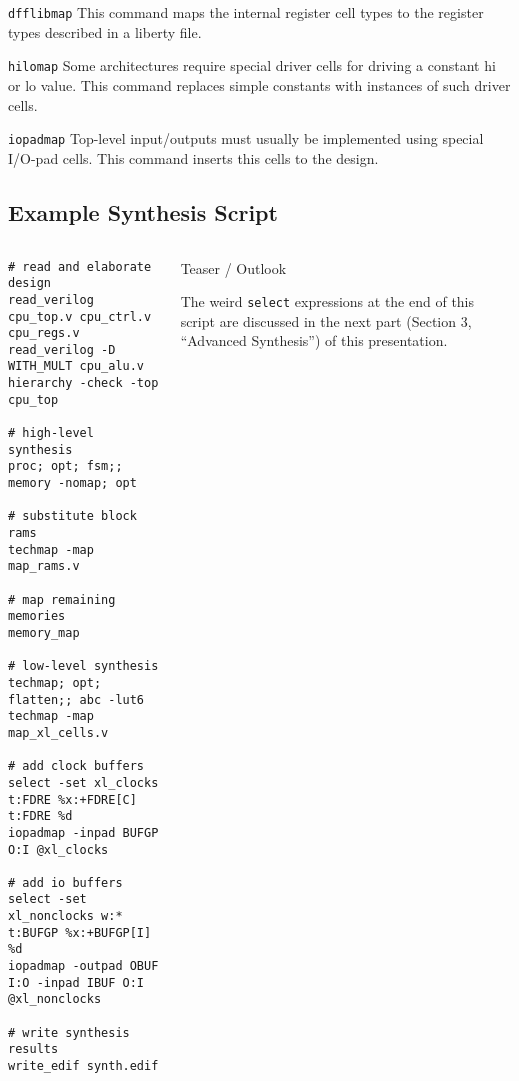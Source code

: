 \begin{frame}{\subsecname}
\begin{block}{\tt dfflibmap}
This command maps the internal register cell types to the register types
described in a liberty file.
\end{block}

\bigskip
\begin{block}{\tt hilomap}
Some architectures require special driver cells for driving a constant hi or lo
value. This command replaces simple constants with instances of such driver cells.
\end{block}

\bigskip
\begin{block}{\tt iopadmap}
Top-level input/outputs must usually be implemented using special I/O-pad cells.
This command inserts this cells to the design.
\end{block}
\end{frame}


\subsection{Example Synthesis Script}

\begin{frame}[fragile]{\subsecname}
\begin{columns}
\column[t]{4cm}
\begin{lstlisting}[basicstyle=\ttfamily\fontsize{6pt}{7pt}\selectfont, language=ys]
# read and elaborate design
read_verilog cpu_top.v cpu_ctrl.v cpu_regs.v
read_verilog -D WITH_MULT cpu_alu.v
hierarchy -check -top cpu_top

# high-level synthesis
proc; opt; fsm;; memory -nomap; opt

# substitute block rams
techmap -map map_rams.v

# map remaining memories
memory_map

# low-level synthesis
techmap; opt; flatten;; abc -lut6
techmap -map map_xl_cells.v

# add clock buffers
select -set xl_clocks t:FDRE %x:+FDRE[C] t:FDRE %d
iopadmap -inpad BUFGP O:I @xl_clocks

# add io buffers
select -set xl_nonclocks w:* t:BUFGP %x:+BUFGP[I] %d
iopadmap -outpad OBUF I:O -inpad IBUF O:I @xl_nonclocks

# write synthesis results
write_edif synth.edif
\end{lstlisting}
\column[t]{6cm}
\vskip1cm
\begin{block}{Teaser / Outlook}
\small\parbox{6cm}{
The weird {\tt select} expressions at the end of this script are discussed in
the next part (Section 3, ``Advanced Synthesis'') of this presentation.}
\end{block}
\end{columns}
\end{frame}

